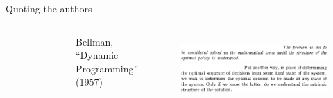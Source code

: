 \documentclass[aspectratio=169]{beamer}
\begin{document}
\begin{frame}{Quoting the authors}
\begin{columns}
\begin{columns}
\begin{figure}
\includegraphics[width=\columnwidth]{figures/bellman.jpg}
\end{figure}
Bellman, \\ ``Dynamic Programming'' (1957)
\end{columns}
\begin{figure}[h]
\includegraphics[width=.9\columnwidth]{figures/bellman_quote_1.png} \\
\includegraphics[width=.9\columnwidth]{figures/bellman_quote_2.png} \\

\end{figure}
\end{columns}
\end{frame}
\end{document}
